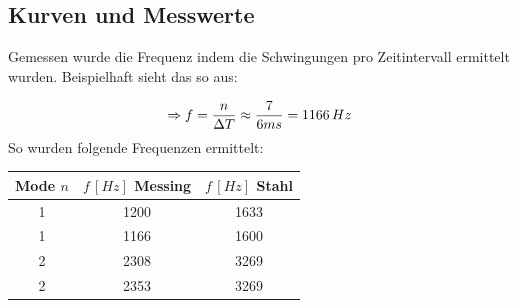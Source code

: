 \subsection{Kurven und Messwerte} Gemessen wurde die Frequenz indem die Schwingungen pro Zeitintervall ermittelt wurden. Beispielhaft sieht das so aus:
\begin{center}
\noindent
\begin{minipage}{\linewidth}
\centering
{}
\end{minipage}
\end{center}
\begin{equation}
\Rightarrow f = \frac{n}{\Delta T} \approx \frac{7}{6ms} = 1166\, Hz \notag
\end{equation}
So wurden folgende Frequenzen ermittelt:
\begin{center}
\begin{tabular}{c|c|c}
Mode \(n\) & \(f\, [Hz]\) Messing & \(f\, [Hz]\) Stahl \\\hline
1 & 1200 & 1633 \\
1 & 1166 & 1600 \\
2 & 2308 & 3269 \\
2 & 2353 & 3269
\end{tabular}
\end{center}

